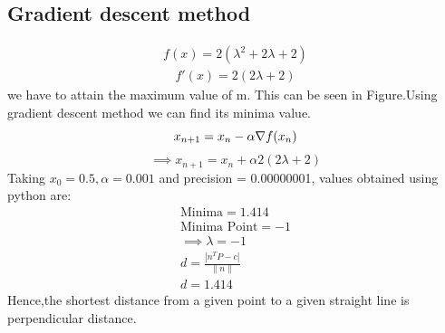 \documentclass[10pt, a4paper]{article}
\begin{document}
    \subsection*{\normalsize Gradient descent method}
    
    \begin{align}
	\label{eq:vol_varx}
	f(x) = 2(\lambda^2+2\lambda+2)
\end{align}
\begin{align}   
    f'(x) = 2(2\lambda+2)
	\end{align}
we have to attain the maximum value of m. This can be seen in Figure.Using gradient descent method we can find its minima value.
\begin{equation}
        x_{n+1} = x_n - \alpha \nabla f(x_n) \\
\end{equation}
\vspace{1mm}
\begin{equation}
\implies x_{n+1}=x_n+\alpha2(2\lambda+2)
\end{equation}
Taking $x_0=0.5,\alpha=0.001$ and precision = 0.00000001, values obtained using python are:
    \begin{align}
        \text{Minima} = 1.414\\        
        \text{Minima Point} = -1\\
        \implies \lambda=-1\\
         d=\frac{|n^TP-c|}{\|n\|}\\
         d = 1.414 
    \end{align}
Hence,the shortest distance from a given point to a given straight line is perpendicular distance.    
   
\end{document}

